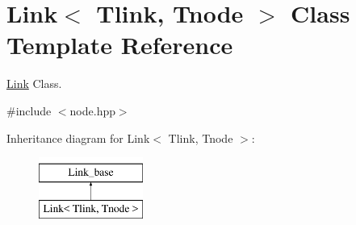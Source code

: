 \hypertarget{classLink}{\section{Link$<$ Tlink, Tnode $>$ Class Template Reference}
\label{classLink}
}


\hyperlink{classLink}{Link} Class.  




{\ttfamily \#include $<$node.\-hpp$>$}

Inheritance diagram for Link$<$ Tlink, Tnode $>$\-:\begin{figure}[H]
\begin{center}
\leavevmode
\includegraphics[height=2.000000cm]{classLink}
\end{center}
\end{figure}

